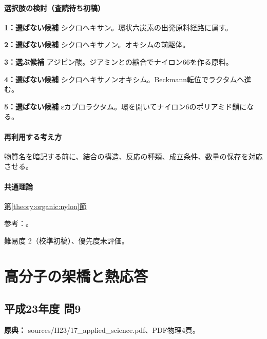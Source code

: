 \paragraph{選択肢の検討（査読待ち初稿）}\mbox{}\par

\noindent\textbf{1：選ばない候補} シクロヘキサン。環状六炭素の出発原料経路に属す。\par

\noindent\textbf{2：選ばない候補} シクロヘキサノン。オキシムの前駆体。\par

\noindent\textbf{3：選ぶ候補} アジピン酸。ジアミンとの縮合でナイロン66を作る原料。\par

\noindent\textbf{4：選ばない候補} シクロヘキサノンオキシム。Beckmann転位でラクタムへ進む。\par

\noindent\textbf{5：選ばない候補} εカプロラクタム。環を開いてナイロン6のポリアミド鎖になる。\par

\paragraph{再利用する考え方} 物質名を暗記する前に、結合の構造、反応の種類、成立条件、数量の保存を対応させる。

\paragraph{共通理論} \hyperref[theory:organic:nylon]{第\ref*{theory:organic:nylon}節}

\par 参考：\cite{organic_step}。

\par 難易度 2（校準初稿）、優先度未評価。

\section{高分子の架橋と熱応答}

\subsection{平成23年度 問9}
\label{q:h23-reg-applied-09}

\noindent\textbf{原典：} sources/H23/17\_applied\_science.pdf、PDF物理4頁。

